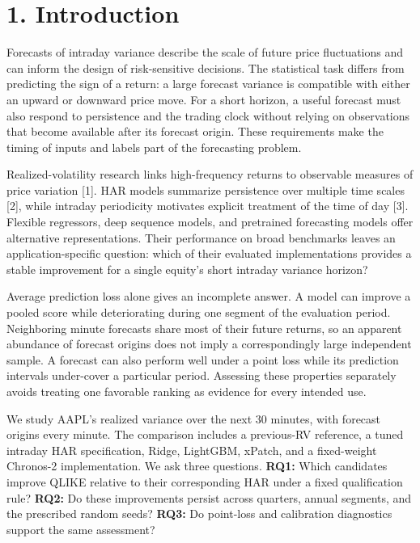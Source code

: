 \section{1. Introduction}\label{introduction}

Forecasts of intraday variance describe the scale of future price
fluctuations and can inform the design of risk-sensitive decisions. The
statistical task differs from predicting the sign of a return: a large
forecast variance is compatible with either an upward or downward price
move. For a short horizon, a useful forecast must also respond to
persistence and the trading clock without relying on observations that
become available after its forecast origin. These requirements make the
timing of inputs and labels part of the forecasting problem.

Realized-volatility research links high-frequency returns to observable
measures of price variation {[}1{]}. HAR models summarize persistence
over multiple time scales {[}2{]}, while intraday periodicity motivates
explicit treatment of the time of day {[}3{]}. Flexible regressors, deep
sequence models, and pretrained forecasting models offer alternative
representations. Their performance on broad benchmarks leaves an
application-specific question: which of their evaluated implementations
provides a stable improvement for a single equity's short intraday
variance horizon?

Average prediction loss alone gives an incomplete answer. A model can
improve a pooled score while deteriorating during one segment of the
evaluation period. Neighboring minute forecasts share most of their
future returns, so an apparent abundance of forecast origins does not
imply a correspondingly large independent sample. A forecast can also
perform well under a point loss while its prediction intervals
under-cover a particular period. Assessing these properties separately
avoids treating one favorable ranking as evidence for every intended
use.

We study AAPL's realized variance over the next 30 minutes, with
forecast origins every minute. The comparison includes a previous-RV
reference, a tuned intraday HAR specification, Ridge, LightGBM, xPatch,
and a fixed-weight Chronos-2 implementation. We ask three questions.
\textbf{RQ1:} Which candidates improve QLIKE relative to their
corresponding HAR under a fixed qualification rule? \textbf{RQ2:} Do
these improvements persist across quarters, annual segments, and the
prescribed random seeds? \textbf{RQ3:} Do point-loss and calibration
diagnostics support the same assessment?

